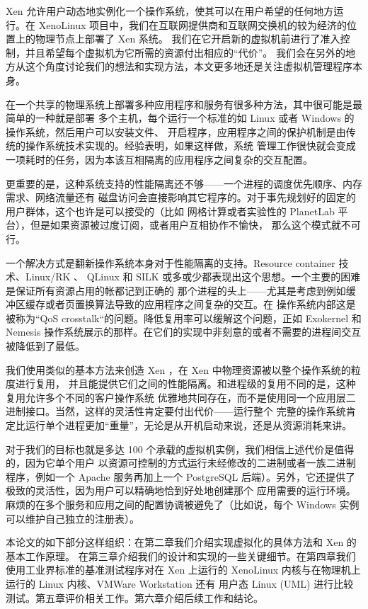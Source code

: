Xen 允许用户动态地实例化一个操作系统，使其可以在用户希望的任何地方运行。在 XenoLinux
项目中，我们在互联网提供商和互联网交换机的较为经济的位置上的物理节点上部署了 Xen 系统。
我们在它开启新的虚拟机前进行了准入控制，并且希望每个虚拟机为它所需的资源付出相应的“代价”。
我们会在另外的地方从这个角度讨论我们的想法和实现方法，本文更多地还是关注虚拟机管理程序本身。

在一个共享的物理系统上部署多种应用程序和服务有很多种方法，其中很可能是最简单的一种就是部署
多个主机，每个运行一个标准的如 Linux 或者 Windows 的操作系统，然后用户可以安装文件、
开启程序，应用程序之间的保护机制是由传统的操作系统技术实现的。经验表明，如果这样做，系统
管理工作很快就会变成一项耗时的任务，因为本该互相隔离的应用程序之间复杂的交互配置。

更重要的是，这种系统支持的性能隔离还不够——一个进程的调度优先顺序、内存需求、网络流量还有
磁盘访问会直接影响其它程序的。对于事先规划好的固定的用户群体，这个也许是可以接受的（比如
网格计算或者实验性的 PlanetLab 平台），但是如果资源被过度订阅，或者用户互相协作不愉快，
那么这个模式就不可行。

一个解决方式是翻新操作系统本身对于性能隔离的支持。Resource container 技术、Linux/RK 、
QLinux 和 SILK 或多或少都表现出这个思想。一个主要的困难是保证所有资源占用的帐都记到正确的
那个进程的头上——尤其是考虑到例如缓冲区缓存或者页置换算法导致的应用程序之间复杂的交互。在
操作系统内部这是被称为“QoS crosstalk“的问题。降低复用率可以缓解这个问题，正如 Exokernel
和 Nemesis 操作系统展示的那样。在它们的实现中非刻意的或者不需要的进程间交互被降低到了最低。

我们使用类似的基本方法来创造 Xen ，在 Xen 中物理资源被以整个操作系统的粒度进行复用，
并且能提供它们之间的性能隔离。和进程级的复用不同的是，这种复用允许多个不同的客户操作系统
优雅地共同存在，而不是使用同一个应用层二进制接口。当然，这样的灵活性肯定要付出代价——运行整个
完整的操作系统肯定比运行单个进程更加“重量”，无论是从开机启动来说，还是从资源消耗来讲。

对于我们的目标也就是多达 100 个承载的虚拟机实例，我们相信上述代价是值得的，因为它单个用户
以资源可控制的方式运行未经修改的二进制或者一族二进制程序，例如一个 Apache 服务再加上一个
PostgreSQL 后端）。另外，它还提供了极致的灵活性，因为用户可以精确地恰到好处地创建那个
应用需要的运行环境。麻烦的在多个服务和应用之间的配置协调被避免了（比如说，每个 Windows 实例
可以维护自己独立的注册表）。

本论文的如下部分这样组织：在第二章我们介绍实现虚拟化的具体方法和 Xen 的基本工作原理。
在第三章介绍我们的设计和实现的一些关键细节。在第四章我们使用工业界标准的基准测试程序对在
Xen 上运行的 XenoLinux 内核与在物理机上运行的 Linux 内核、VMWare Workstation 还有
用户态 Linux (UML) 进行比较测试。第五章评价相关工作。第六章介绍后续工作和结论。

